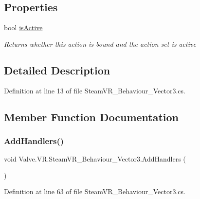 \subsection*{Properties}
\begin{DoxyCompactItemize}
\item 
bool \mbox{\hyperlink{class_valve_1_1_v_r_1_1_steam_v_r___behaviour___vector3_af271a55bc70741d4fe6cc85b379c335c}{is\+Active}}
\begin{DoxyCompactList}\small\item\em Returns whether this action is bound and the action set is active \end{DoxyCompactList}\end{DoxyCompactItemize}


\subsection{Detailed Description}


Definition at line 13 of file Steam\+V\+R\+\_\+\+Behaviour\+\_\+\+Vector3.\+cs.



\subsection{Member Function Documentation}
\mbox{\label{class_valve_1_1_v_r_1_1_steam_v_r___behaviour___vector3_ad7d4531c55b5043582a7a7f945f12144}} 
\subsubsection{\texorpdfstring{AddHandlers()}{AddHandlers()}}
{\footnotesize\ttfamily void Valve.\+V\+R.\+Steam\+V\+R\+\_\+\+Behaviour\+\_\+\+Vector3.\+Add\+Handlers (\begin{DoxyParamCaption}{ }\end{DoxyParamCaption})\hspace{0.3cm}{\ttfamily [protected]}}



Definition at line 63 of file Steam\+V\+R\+\_\+\+Behaviour\+\_\+\+Vector3.\+cs.

